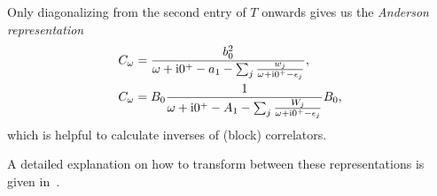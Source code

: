 Only diagonalizing from the second entry of $T$ onwards gives us the \emph{Anderson representation}
\begin{subequations}
    \begin{align}
        C_\omega
         & =
        \frac{b_0^2}{\omega + \mathrm{i}0^+ - a_1 - \sum_{j} \frac{w_j}{\omega + \mathrm{i}0^+ - \epsilon_j}}, \\
        C_\omega
         & =
        B_0\frac{1}{\omega + \mathrm{i}0^+ - A_1 - \sum_{j} \frac{W_j}{\omega + \mathrm{i}0^+ - \epsilon_j}}B_0,
    \end{align}%
    \label{eq:correlator-anderson}%
\end{subequations}
which is helpful to calculate inverses of (block) correlators.

A detailed explanation on how to transform between these representations is given in~\cite{Lu2014}.

